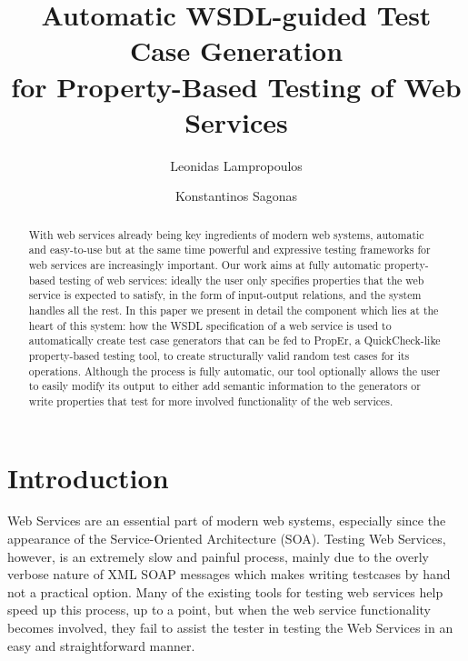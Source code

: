 \documentclass[submission,copyright]{eptcs}
\title{Automatic WSDL-guided Test Case Generation\\
       for Property-Based Testing of Web Services}
\author{Leonidas Lampropoulos \and Konstantinos Sagonas}
\begin{document}
\maketitle

\begin{abstract}
With web services already being key ingredients of modern web systems,
automatic and easy-to-use but at the same time powerful and expressive
testing frameworks for web services are increasingly important. Our
work aims at fully automatic property-based testing of web services:
ideally the user only specifies properties that the web service is
expected to satisfy, in the form of input-output relations, and the
system handles all the rest. In this paper we present in detail the
component which lies at the heart of this system: how the WSDL
specification of a web service is used to automatically create test
case generators that can be fed to PropEr, a QuickCheck-like
property-based testing tool, to create structurally valid random
test cases for its operations. Although the process is fully automatic,
our tool optionally allows the user to easily modify its output to
either add semantic information to the generators or write properties
that test for more involved functionality of the web services.
\end{abstract}


\section{Introduction}


Web Services are an essential part of modern web systems, especially
since the appearance of the Service-Oriented Architecture (SOA).
Testing Web Services, however, is an extremely slow and painful
process, mainly due to the overly verbose nature of XML SOAP messages
which makes writing testcases by hand not a practical option. Many of
the existing tools for testing web services help speed up this
process, up to a point, but when the web service functionality becomes
involved, they fail to assist the tester in testing the Web Services
in an easy and straightforward manner.

\end{document}
